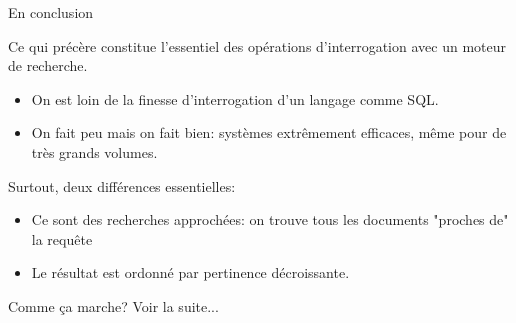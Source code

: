 



\begin{frame}[fragile]{En conclusion}


Ce qui précère constitue l'essentiel des opérations d'interrogation avec un moteur
de recherche.

  \begin{itemize}
    \item On est loin de la finesse d'interrogation d'un langage comme SQL.
    
    \item On fait peu mais on fait bien: systèmes extrêmement efficaces, même pour
        de très grands volumes. 
  \end{itemize}

\vfill

\alert{Surtout}, deux différences essentielles:

 \begin{itemize}
    \item Ce sont des recherches \alert{approchées}: on trouve tous les documents "proches de" la requête
    \item Le résultat est \alert{ordonné} par pertinence décroissante.
  \end{itemize}

\vfill

Comme ça marche? Voir la suite...
\end{frame}

